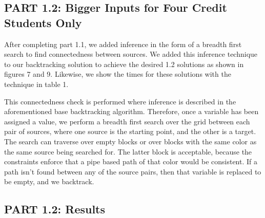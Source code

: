 \documentclass[11pt]{article}
\begin{document}
\subsection*{PART 1.2: Bigger Inputs for Four Credit Students Only}

After completing part 1.1, we added inference in the form of a breadth first search to find connectedness between sources. We added this inference technique to our backtracking solution to achieve the desired 1.2 solutions as shown in figures 7 and 9. Likewise, we show the times for these solutions with the technique in table 1.

This connectedness check is performed where inference is described in the aforementioned base backtracking algorithm. Therefore, once a variable has been assigned a value, we perform a breadth first search over the grid between each pair of sources, where one source is the starting point, and the other is a target. The search can traverse over empty blocks or over blocks with the same color as the same source being searched for. The latter block is acceptable, because the constraints enforce that a pipe based path of that color would be consistent. If a path isn't found between any of the source pairs, then that variable is replaced to be empty, and we backtrack.


\subsection*{PART 1.2: Results}
\end{document}
